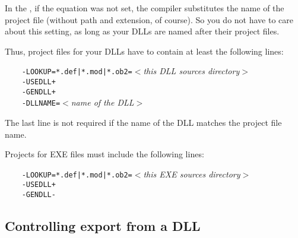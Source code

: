 In the , if the  equation was
not set, the compiler substitutes the name of the project file (without path and extension,
of course). So you do not have to care about this setting, as long as your DLLs
are named after their project files.

Thus, project files for your DLLs have to contain at least the following lines:

\verb'    -LOOKUP=*.def|*.mod|*.ob2='{\it $<$this DLL sources directory$>$}\\
\verb'    -USEDLL+'\\
\verb'    -GENDLL+'\\
\verb'    -DLLNAME='{\it $<$name of the DLL$>$}

The last line is not required if the name of the DLL matches the project file name.

Projects for EXE files must include the following lines:

\verb'    -LOOKUP=*.def|*.mod|*.ob2='{\it $<$this EXE sources directory$>$}\\
\verb'    -USEDLL+'\\
\verb'    -GENDLL-'

\subsection{Controlling export from a DLL}
\label{dll:create:export}

